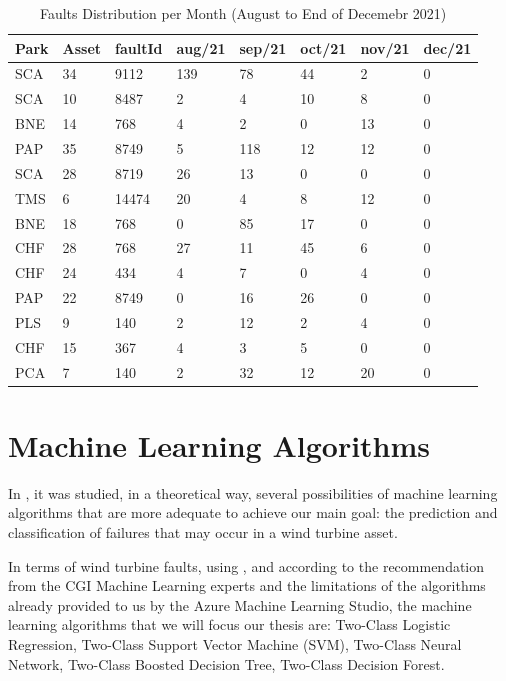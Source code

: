 \begin{table}[!ht]
    \centering
    \begin{tabular}{|l|l|l|l|l|l|l|l|}
    \hline
        Park & Asset & faultId & aug/21 & sep/21 & oct/21 & nov/21 & dec/21 \\ \hline
        SCA & 34 & 9112 & 139 & 78 & 44 & 2 & 0 \\ \hline
        SCA & 10 & 8487 & 2 & 4 & 10 & 8 & 0 \\ \hline
        BNE & 14 & 768 & 4 & 2 & 0 & 13 & 0 \\ \hline
        PAP & 35 & 8749 & 5 & 118 & 12 & 12 & 0 \\ \hline
        SCA & 28 & 8719 & 26 & 13 & 0 & 0 & 0 \\ \hline
        TMS & 6 & 14474 & 20 & 4 & 8 & 12 & 0 \\ \hline
        BNE & 18 & 768 & 0 & 85 & 17 & 0 & 0 \\ \hline
        CHF & 28 & 768 & 27 & 11 & 45 & 6 & 0 \\ \hline
        CHF & 24 & 434 & 4 & 7 & 0 & 4 & 0 \\ \hline
        PAP & 22 & 8749 & 0 & 16 & 26 & 0 & 0 \\ \hline
        PLS & 9 & 140 & 2 & 12 & 2 & 4 & 0 \\ \hline
        CHF & 15 & 367 & 4 & 3 & 5 & 0 & 0 \\ \hline
        PCA & 7 & 140 & 2 & 32 & 12 & 20 & 0 \\ \hline
    \end{tabular}
    \caption{Faults Distribution per Month (August to End of Decemebr 2021)}
    \label{FaultsDistribitutionAugDec21}
\end{table}


\section{Machine Learning Algorithms} 
\label{sub:if_you_use_this_template} 

In \cite{OLD_15_WIND} \cite{40_WIND} \cite{OLD_36_SOLAR}, it was studied, in a theoretical way, several possibilities of machine learning algorithms that are more adequate to achieve our main goal: the prediction and classification of failures that may occur in a wind turbine asset.

In terms of wind turbine faults, using \cite{OLD_15_WIND} \cite{OLD_53_WIND} \cite{40_WIND} \cite{ML_Alg_Analysis}, \cite{ML_Data_processing} and according to the recommendation from the CGI Machine Learning experts and the limitations of the algorithms already provided to us by the Azure Machine Learning Studio, the machine learning algorithms that we will focus our thesis are: Two-Class Logistic Regression, Two-Class Support Vector Machine (SVM), Two-Class Neural Network, Two-Class Boosted Decision Tree, Two-Class Decision Forest.

